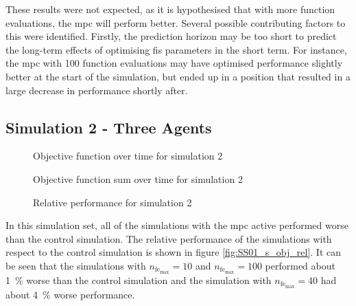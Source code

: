 \documentclass[conference]{IEEEtran}
\begin{document}
These results were not expected, as it is hypothesised that with more function evaluations, the \gls{mpc} will perform better.
Several possible contributing factors to this were identified.
Firstly, the prediction horizon may be too short to predict the long-term effects of optimising \gls{fis} parameters in the short term.
For instance, the \gls{mpc} with 100 function evaluations may have optimised performance slightly better at the start of the simulation, but ended up in a position that resulted in a large decrease in performance shortly after.

\subsection{Simulation 2 - Three Agents} \label{subsec:results_SS02}

\begin{figure}[h]
    \centering
    
    \caption{Objective function over time for simulation 2}
    \label{fig:SS02_obj_hist}
\end{figure} 

%     

\begin{figure}[h]
    \centering
    
    \caption{Objective function sum over time for simulation 2}
    \label{fig:SS02_s_obj_hist}
\end{figure}

\begin{figure}[h]
    \centering
    
    \caption{Relative performance for simulation 2}
    \label{fig:SS02_s_obj_rel}
\end{figure}


In this simulation set, all of the simulations with the \gls{mpc} active performed worse than the control simulation.
The relative performance of the simulations with respect to the control simulation is shown in figure \ref{fig:SS01_s_obj_rel}.
It can be seen that the simulations with $n_{\text{fe}_{\text{max}}} = 10$ and $n_{\text{fe}_{\text{max}}} = 100$ performed about \SI{1}{\percent} worse than the control simulation and the simulation with $n_{\text{fe}_{\text{max}}} = 40$ had about \SI{4}{\percent} worse performance.
\end{document}
